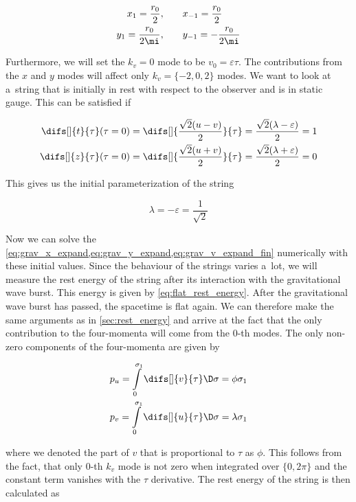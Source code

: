 \begin{equation}
\begin{aligned}
    x_1 = \frac{r_0}{2},& \qquad x_{-1} = \frac{r_0}{2} \\
    y_1 = \frac{r_0}{2 \mi},& \qquad y_{-1} = -\frac{r_0}{2 \mi}
\end{aligned}
\end{equation}

\noindent
Furthermore, we will set the $k_v = 0$ mode to be $v_0 = \varepsilon \tau$. The contributions from the $x$ and $y$ modes will affect only $k_v = \{ -2, 0, 2\}$ modes. We want to look at a~string that is initially in rest with respect to the observer and is in static gauge. This can be satisfied if

\begin{align}
    \difs[]{t}{\tau}(\tau = 0) = \difs[]{\frac{\sqrt{2}(u-v)}{2}}{\tau} = \frac{\sqrt{2}(\lambda - \varepsilon)}{2} = 1 \\
    \difs[]{z}{\tau}(\tau = 0) = \difs[]{\frac{\sqrt{2}(u+v)}{2}}{\tau} = \frac{\sqrt{2}(\lambda + \varepsilon)}{2} = 0
\end{align}

\noindent
This gives us the initial parameterization of the string

\begin{equation}
    \lambda = -\varepsilon = \frac{1}{\sqrt{2}}
\end{equation}

\noindent
Now we can solve the \cref{eq:grav_x_expand,eq:grav_y_expand,eq:grav_v_expand_fin} numerically with these initial values. Since the behaviour of the strings varies a~lot, we will measure the rest energy of the string after its interaction with the gravitational wave burst. This energy is given by \cref{eq:flat_rest_energy}. After the gravitational wave burst has passed, the spacetime is flat again. We can therefore make the same arguments as in \cref{sec:rest_energy} and arrive at the fact that the only contribution to the four-momenta will come from the $0$-th modes. The only non-zero components of the four-momenta are given by

\begin{align}
    p_u = \int\limits_0^{\sigma_1} \difs[]{v}{\tau} \D \sigma = \phi \sigma_1 \\
    p_v = \int\limits_0^{\sigma_1} \difs[]{u}{\tau} \D \sigma = \lambda \sigma_1
\end{align}

\noindent
where we denoted the part of $v$ that is proportional to $\tau$ as $\phi$. This follows from the fact, that only $0$-th $k_v$ mode is not zero when integrated over $\{0, 2 \pi\}$ and the constant term vanishes with the $\tau$ derivative. The rest energy of the string is then calculated as


